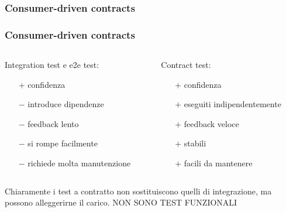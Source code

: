 \documentclass[aspectratio=169]{beamer}
\begin{document}
\begin{frame}
\frametitle{Consumer-driven contracts}
\center
{}
\end{frame}

\begin{frame}
\frametitle{Consumer-driven contracts}
\begin{columns}
  \begin{column}{0.48\textwidth}
Integration test e e2e test:
\begin{itemize}
\item[$+$] confidenza
\item[$-$] introduce dipendenze
\item[$-$] feedback lento
\item[$-$] si rompe facilmente
\item[$-$] richiede molta manutenzione
\end{itemize}
  \end{column}
  \begin{column}{0.48\textwidth}
Contract test:
\begin{itemize}
\item[$+$] confidenza
\item[$+$] eseguiti indipendentemente
\item[$+$] feedback veloce
\item[$+$] stabili
\item[$+$] facili da mantenere
\end{itemize}
  \end{column}
\end{columns}
\vspace*{0.45cm}

Chiaramente i test a contratto non sostituiscono quelli di integrazione, ma possono alleggerirne il carico.
\center
{}
NON SONO TEST FUNZIONALI
\end{frame}
\end{document}
